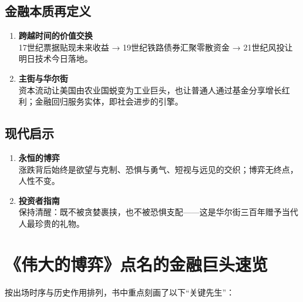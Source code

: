 \subsection{金融本质再定义}
\begin{enumerate}[leftmargin=*, nosep]
  \item \textbf{跨越时间的价值交换}  \\
  17世纪票据贴现未来收益 → 19世纪铁路债券汇聚零散资金 → 21世纪风投让明日技术今日落地。
  
  \item \textbf{主街与华尔街}  \\
  资本流动让美国由农业国蜕变为工业巨头，也让普通人通过基金分享增长红利；金融回归服务实体，即社会进步的引擎。
\end{enumerate}

\subsection{现代启示}
\begin{enumerate}[leftmargin=*, nosep]
  \item \textbf{永恒的博弈}  \\
  涨跌背后始终是欲望与克制、恐惧与勇气、短视与远见的交织；博弈无终点，人性不变。
  
  \item \textbf{投资者指南}  \\
  保持清醒：既不被贪婪裹挟，也不被恐惧支配——这是华尔街三百年赠予当代人最珍贵的礼物。
\end{enumerate}

\section{《伟大的博弈》点名的金融巨头速览}
按出场时序与历史作用排列，书中重点刻画了以下“关键先生”：

